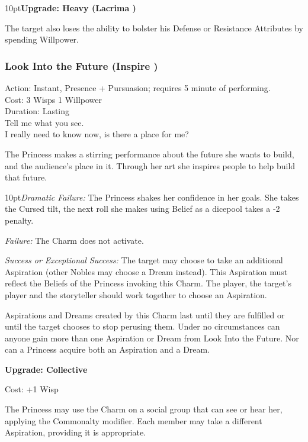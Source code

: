 \begin{myindentpar}{10pt}\textbf{Upgrade: Heavy (Lacrima \textbullet\textbullet\textbullet)}

The target also loses the ability to bolster his Defense or Resistance Attributes by spending Willpower.\end{myindentpar}

\subsubsection*{Look Into the Future (Inspire \textbullet\textbullet\textbullet)}

\noindent Action: Instant, Presence + Pursuasion; requires 5 minute of performing. \\

\noindent Cost: 3 Wisps 1 Willpower\\

\noindent Duration: Lasting \\

\noindent Tell me what you see.\\ 

\noindent I really need to know now, is there a place for me?

The Princess makes a stirring performance about the future she wants to build, and the audience's place in it. Through her art she inspires people to help build that future. 

   \begin{myindentpar}{10pt}\emph{Dramatic Failure:} The Princess shakes her confidence in her goals. She takes the Cursed tilt, the next roll she makes using Belief as a dicepool takes a -2 penalty. 

    \emph{Failure:} The Charm does not activate.

    \emph{Success or Exceptional Success:} The target may choose to take an additional Aspiration (other Nobles may choose a Dream instead). This Aspiration must reflect the Beliefs of the Princess invoking this Charm. The player, the target's player and the storyteller should work together to choose an Aspiration. 
    
    Aspirations and Dreams created by this Charm last until they are fulfilled or until the target chooses to stop perusing them. Under no circumstances can anyone gain more than one Aspiration or Dream from Look Into the Future. Nor can a Princess acquire both an Aspiration and a Dream.   

\textbf{Upgrade: Collective}

\noindent Cost: +1 Wisp

The Princess may use the Charm on a social group that can see or hear her, applying the Commonalty modifier. Each member may take a different Aspiration, providing it is appropriate.\end{myindentpar}

